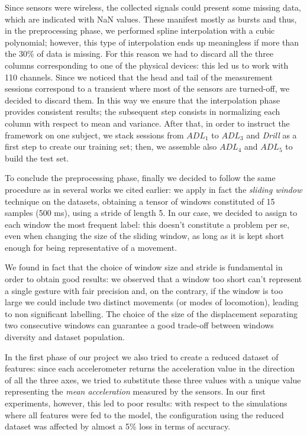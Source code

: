Since sensors were wireless, the collected signals could present some missing data, which are indicated with NaN values. These manifest mostly as bursts and thus, in the preprocessing phase, we performed spline interpolation with a cubic polynomial; however, this type of interpolation ends up meaningless if more than the 30\% of data is missing. For this reason we had to discard all the three columns corresponding to one of the physical devices: this led us to work with 110 channels. Since we noticed that the head and tail of the measurement sessions correspond to a transient where most of the sensors are turned-off, we decided to discard them. In this way we ensure that the interpolation phase provides consistent results; the subsequent step consists in normalizing each column with respect to mean and variance. After that, in order to instruct the framework on one subject, we stack sessions from $ADL_1$ to $ADL_3$ and \textit{Drill} as a first step to create our training set; then, we assemble also $ADL_4$ and $ADL_5$ to build the test set. 

To conclude the preprocessing phase, finally we decided to follow the same procedure as in several works we cited earlier: we apply in fact the \textit{sliding window} technique on the datasets, obtaining a tensor of windows constituted of 15 samples (500 ms), using a stride of length 5. In our case, we decided to assign to each window the most frequent label: this doesn't constitute a problem per se, even when changing the size of the sliding window, as long as it is kept short enough for being representative of a movement.

We found in fact that the choice of window size and stride is fundamental in order to obtain good results: we observed that a window too short can't represent a single gesture with fair precision and, on the contrary, if the window is too large we could include two distinct movements (or modes of locomotion), leading to non significant labelling. The choice of the size of the displacement separating two consecutive windows can guarantee a good trade-off between windows diversity and dataset population.

In the first phase of our project we also tried to create a reduced dataset of features: since each accelerometer returns the acceleration value in the direction of all the three axes, we tried to substitute these three values with a unique value representing the \textit{mean acceleration} measured by the sensors. In our first experiments, however, this led to poor results: with respect to the simulations where all features were fed to the model, the configuration using the reduced dataset was affected by almost a 5\% loss in terms of accuracy. 

